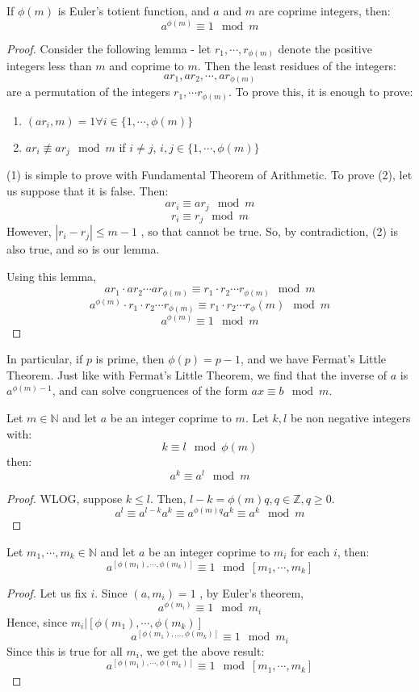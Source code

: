 \documentclass[12pt,letterpaper]{book}
\theoremstyle{definition}
\newcommand{\N}{\mathbb{N}}
\newcommand{\Z}{\mathbb{Z}}
\begin{document}
\begin{theorem}
  If $\phi(m)$ is Euler's totient function, and $a$ and $m$ are coprime integers, then:
  \[a^{\phi(m)} \equiv 1 \mod m\]
\end{theorem}
\begin{proof}
  Consider the following lemma - let $r_1, \cdots , r_{\phi(m)}$ denote the positive integers less than $m$ and coprime to $m$. Then the least residues of the integers:
  \[ar_1, ar_2, \cdots, ar_{\phi(m)}\]
  are a permutation of the integers $r_1, \cdots r_{\phi(m)}$.
  To prove this, it is enough to prove:
  \begin{enumerate}
    \item $(ar_i, m) = 1 \forall i \in \{1, \cdots, \phi(m)\}$
    \item $ar_i \not \equiv ar_j \mod m$ if $i \neq j$, $i,j \in \{1, \cdots, \phi(m)\}$
  \end{enumerate}
  (1) is simple to prove with Fundamental Theorem of Arithmetic. To prove (2), let us suppose that it is false. Then:
  \[ar_i \equiv ar_j \mod m\]
  \[r_i \equiv r_j \mod m\]
  However, $|r_i-r_j| \leq m-1$ , so that cannot be true. So, by contradiction, (2) is also true, and so is our lemma.

  Using this lemma,
  \[ar_1 \cdot ar_2 \cdots ar_{\phi(m)} \equiv r_1 \cdot r_2 \cdots r_{\phi(m)} \mod m\]
  \[a^{\phi(m)} \cdot r_1 \cdot r_2 \cdots r_{\phi(m)} \equiv r_1 \cdot r_2 \cdots r_\phi(m) \mod m\]
  \[a^{\phi(m)} \equiv 1 \mod m\]
\end{proof}

In particular, if $p$ is prime, then $\phi(p) = p-1$, and we have Fermat's Little Theorem. Just like with Fermat's Little Theorem, we find that the inverse of $a$ is $a^{\phi(m)-1}$, and can solve congruences of the form $ax \equiv b \mod m$.

\begin{lemma}
  Let $m \in \N$ and let $a$ be an integer coprime to $m$. Let $k,l$ be non negative integers with:
  \[k \equiv l \mod \phi(m)\]
  then:
  \[a^k \equiv a^l \mod m\]
\end{lemma}
\begin{proof}
  WLOG, suppose $k \leq l$. Then, $l-k = \phi(m) q, q \in \Z, q \geq 0$.
  \[a^l \equiv a^{l-k}a^k \equiv a^{\phi(m)q}a^k \equiv a^k \mod m\]
\end{proof}

\begin{theorem}
  Let $m_1, \cdots, m_k \in \N$ and let $a$ be an integer coprime to $m_i$ for each $i$, then:
\[a^{[\phi(m_1), \cdots, \phi(m_k)]} \equiv 1 \mod [m_1 , \cdots, m_k]\]
\end{theorem}
\begin{proof}
  Let us fix $i$. Since $(a,m_i) = 1$ , by Euler's theorem,
  \[a^{\phi(m_i)} \equiv 1 \mod m_i\]
  Hence, since $m_i | [\phi(m_1) , \cdots , \phi(m_k)]$
  \[a^{[\phi(m_1), ..., \phi(m_k)]} \equiv 1 \mod m_i\]
  Since this is true for all $m_i$, we get the above result:
\[a^{[\phi(m_1), \cdots, \phi(m_k)]} \equiv 1 \mod [m_1 , \cdots, m_k]\]
\end{proof}
\end{document}
